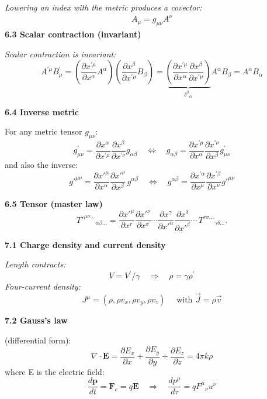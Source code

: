 \documentclass[10pt]{article}
\newcommand{\chead}[1]{\vspace{6pt}{\large \textbf{#1}}\par}
\begin{document}
\begin{multicols*}{2}
\textit{Lowering an index with the metric produces a covector:}
$$
\begin{aligned}
A_\mu=g_{\mu\nu}A^{\nu}
\end{aligned}
$$
\textbf{6.3 Scalar contraction (invariant)}

\textit{Scalar contraction is invariant:}
\[A^{\prime \mu} B_\mu^{\prime}=\left(\frac{\partial x^{\prime \mu}}{\partial x^\alpha} A^\alpha\right)\left(\frac{\partial x^\beta}{\partial x^{\prime \mu}} B_\beta\right)=\underbrace{\left(\frac{\partial x^{\prime \mu}}{\partial x^\alpha} \frac{\partial x^\beta}{\partial x^{\prime \mu}}\right)}_{\delta^\beta{ }_\alpha} A^\alpha B_\beta=A^\alpha B_\alpha\]

\textbf{6.4 Inverse metric}

For any metric tensor $g_{\mu \nu}$:
\[
\boxed{g_{\mu \nu}^{\prime}=\frac{\partial x^\alpha}{\partial x^{\prime \mu}} \frac{\partial x^\beta}{\partial x^{\prime \nu}} g_{\alpha \beta} \quad\Longleftrightarrow\quad g_{\alpha \beta}=\frac{\partial x^{\prime \mu}}{\partial x^\alpha} \frac{\partial x^{\prime \nu}}{\partial x^\beta} g_{\mu \nu}^{\prime}}
\]
and also the inverse:
\[
\boxed{g'^{\mu\nu}=\frac{\partial x'^\mu}{\partial x^{\alpha}}\frac{\partial x'^\nu}{\partial x^{\beta}}\,g^{\alpha\beta} \quad\Longleftrightarrow\quad g^{\alpha\beta}=\frac{\partial x^{\prime \alpha}}{\partial x^\mu} \frac{\partial x^{\prime \beta}}{\partial x^\nu} g'^{\mu\nu}}
\]

\textbf{6.5 Tensor (master law)}
\[
T'^{\mu\nu\dots}{}_{\alpha\beta\dots}
=\frac{\partial x'^\mu}{\partial x^{r}}\frac{\partial x'^\nu}{\partial x^{\sigma}}\cdots
\frac{\partial x^{\gamma}}{\partial x'^\alpha}\frac{\partial x^{\delta}}{\partial x'^\beta}\cdots
\,T^{r\sigma\dots}{}_{\gamma\delta\dots}.
\]

\chead{Ch 7. Maxwell}
\textbf{7.1 Charge density and current density}

\textit{Length contracts:}
$$V=V^{\prime} / \gamma \quad\Longrightarrow\quad \rho=\gamma \rho^{\prime}$$
\textit{Four-current density:}
$$\boxed{J^\mu=\left(\rho, \rho v_x, \rho v_y, \rho v_z\right) \quad\text{ with }\vec{J}=\rho \vec{v}}$$

\textbf{7.2 Gauss's law}

(differential form):
\[
\nabla \cdot \mathbf{E}=\frac{\partial E_x}{\partial x}+\frac{\partial E_y}{\partial y}+\frac{\partial E_z}{\partial z}=4 \pi k \rho
\]
where E is the electric field:
\[
\frac{d \mathbf{p}}{d t}=\mathbf{F}_e=q \mathbf{E} \quad\Longrightarrow\quad 
\boxed{\frac{d p^\mu}{d \tau}=q F^\mu{ }_\nu u^\nu}
\]




\end{multicols*}
\end{document}
